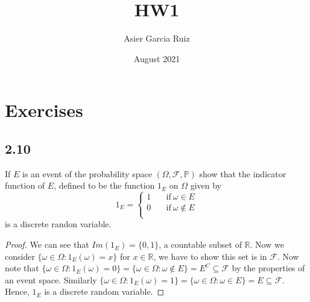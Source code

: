 \documentclass{article}
\title{HW1}
\author{Asier Garcia Ruiz }
\date{August 2021}
\newcommand{\R}{\mathbb{R}}
\newcommand{\F}{\mathcal{F}}
\newcommand{\probspace}{(\Omega, \mathcal{F}, \mathbb{P})}
\begin{document}
    \maketitle
    \section*{Exercises}
    \subsection*{2.10}
    If $E$ is an event of the probability space $\probspace$ show that
    the indicator function of $E$, defined to be the function $1_E$ on
    $\Omega$ given by
    \begin{equation*}
        1_E =\begin{cases}
            1 \quad &\text{if} \ \omega \in E \\
            0 \quad &\text{if} \ \omega \notin E \\
        \end{cases}
    \end{equation*}
    is a discrete randon variable.
    \begin{proof}
        We can see that $Im(1_E) = \{0, 1\}$, a countable subset of $\R$. Now we consider
        $\{\omega \in \Omega : 1_E(\omega) = x\}$ for $x \in \R$, we have to show this set
        is in $\F$. Now note that
        $\{\omega \in \Omega : 1_E(\omega) = 0\} = \{\omega \in \Omega: \omega \notin E\}
        = E^C \subseteq \F$ by the properties of an event space. Similarly
        $\{\omega \in \Omega : 1_E(\omega) = 1\} = \{\omega \in \Omega : \omega \in E\}
        = E \subseteq \F$. Hence, $1_E$ is a discrete random variable.
    \end{proof}
\end{document}
